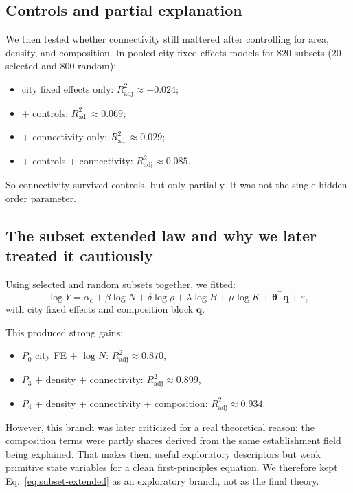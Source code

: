 \documentclass[11pt]{article}
\newcommand{\adjR}{R^2_{\mathrm{adj}}}
\begin{document}
\subsection{Controls and partial explanation}

We then tested whether connectivity still mattered after controlling for area, density, and composition. In pooled city-fixed-effects models for \(820\) subsets (\(20\) selected and \(800\) random):
\begin{itemize}
\item city fixed effects only: \(\adjR \approx -0.024\);
\item + controls: \(\adjR \approx 0.069\);
\item + connectivity only: \(\adjR \approx 0.029\);
\item + controls + connectivity: \(\adjR \approx 0.085\).
\end{itemize}

So connectivity survived controls, but only partially. It was not the single hidden order parameter.

\subsection{The subset extended law and why we later treated it cautiously}

Using selected and random subsets together, we fitted:
\begin{equation}
\log Y
=
\alpha_c + \beta \log N + \delta \log \rho + \lambda \log B + \mu \log K + \bm{\theta}^\top \mathbf{q} + \varepsilon,
\label{eq:subset-extended}
\end{equation}
with city fixed effects and composition block \(\mathbf{q}\).

This produced strong gains:
\begin{itemize}
\item \(P_0\) city FE + \(\log N\): \(\adjR \approx 0.870\),
\item \(P_3\) + density + connectivity: \(\adjR \approx 0.899\),
\item \(P_4\) + density + connectivity + composition: \(\adjR \approx 0.934\).
\end{itemize}

However, this branch was later criticized for a real theoretical reason: the composition terms were partly shares derived from the same establishment field being explained. That makes them useful exploratory descriptors but weak primitive state variables for a clean first-principles equation. We therefore kept Eq.~\eqref{eq:subset-extended} as an exploratory branch, not as the final theory.
\end{document}
